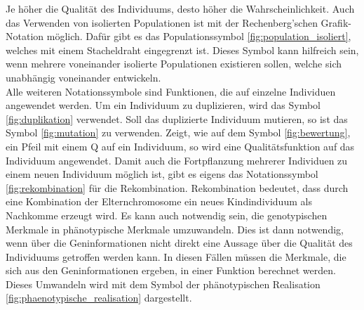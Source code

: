 Je höher die Qualität des Individuums, desto höher die Wahrscheinlichkeit. Auch das Verwenden von isolierten Populationen ist mit der Rechenberg'schen Grafik-Notation möglich. Dafür gibt es das Populationssymbol \ref{fig:population_isoliert}, welches mit einem Stacheldraht eingegrenzt ist. Dieses Symbol kann hilfreich sein, wenn mehrere voneinander isolierte Populationen existieren sollen, welche sich unabhängig voneinander entwickeln.\\
Alle weiteren Notationssymbole sind Funktionen, die auf einzelne Individuen angewendet werden. Um ein Individuum zu duplizieren, wird das Symbol \ref{fig:duplikation} verwendet. Soll das duplizierte Individuum mutieren, so ist das Symbol \ref{fig:mutation} zu verwenden. Zeigt, wie auf dem Symbol \ref{fig:bewertung}, ein Pfeil mit einem Q auf ein Individuum, so wird eine Qualitätsfunktion auf das Individuum angewendet. Damit auch die Fortpflanzung mehrerer Individuen zu einem neuen Individuum möglich ist, gibt es eigens das Notationssymbol \ref{fig:rekombination} für die Rekombination. Rekombination bedeutet, dass durch eine Kombination der Elternchromosome ein neues Kindindividuum als Nachkomme erzeugt wird.
Es kann auch notwendig sein, die genotypischen Merkmale in phänotypische Merkmale umzuwandeln. Dies ist dann notwendig, wenn über die Geninformationen nicht direkt eine Aussage über die Qualität des Individuums getroffen werden kann. In diesen Fällen müssen die Merkmale, die sich aus den Geninformationen ergeben, in einer Funktion berechnet werden. Dieses Umwandeln wird mit dem Symbol der phänotypischen Realisation \ref{fig:phaenotypische_realisation} dargestellt.

